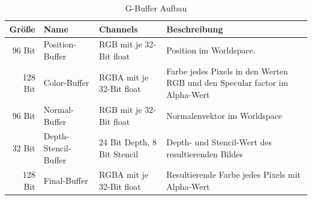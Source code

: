 \begin{table}
	\caption{G-Buffer Aufbau}
	\label{table:GBuffer}
	\centering
	\begin{tabular}{rlll}\toprule[1.5pt]
		Größe & Name & Channels & Beschreibung \\\midrule
		96 Bit  & Position-Buffer & RGB mit je 32-Bit float & Position im Worldspace.\\
		128 Bit & Color-Buffer & RGBA mit je 32-Bit float & Farbe jedes Pixels in den Werten RGB und den Specular factor im Alpha-Wert \\
		96 Bit & Normal-Buffer & RGB mit je 32-Bit float & Normalenvektor im Worldspace \\
		32 Bit & Depth-Stencil-Buffer & 24 Bit Depth, 8 Bit Stencil & Depth- und Stencil-Wert des resultierenden Bildes \\
		128 Bit & Final-Buffer & RGBA mit je 32-Bit float & Resultierende Farbe jedes Pixels mit Alpha-Wert \\\bottomrule[1.5pt]
	\end{tabular}
\end{table}
